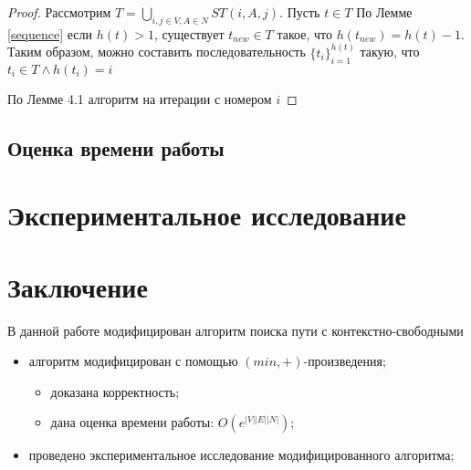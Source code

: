 \documentclass[14pt]{matmex-diploma}
\theoremstyle{definition}
\begin{document}
        \begin{proof}
            Рассмотрим  $T = \bigcup_{i,j \in V, A \in N}ST(i,A,j)$. Пусть $t \in T$
            По Лемме \ref{sequence} если $h(t) > 1$, существует $t_{new} \in T$ такое, что $h(t_{new}) = h(t)-1$. Таким образом, можно составить последовательность $\{t_i\}^{h(t)}_{i=1}$ такую, что $t_i \in T \land h(t_i) = i$
            
           По Лемме 4.1\cite{DBLP:journals/corr/AzimovG17} алгоритм на итерации с номером $i$ 
        \end{proof}
    \subsection{Оценка времени работы}
\section{Экспериментальное исследование}
    
\section*{Заключение}
    В данной работе модифицирован алгоритм поиска пути с контекстно-свободными %
    \begin{itemize}
        \item алгоритм модифицирован с помощью $(min, +)$-произведения;
        \begin{itemize}
            \item доказана корректность;
            \item дана оценка времени работы: $O(e^{|V||E||N|})$;
        \end{itemize}
        \item проведено экспериментальное исследование модифицированного алгоритма;
    \end{itemize}
    
\setmonofont[Mapping=tex-text]{CMU Typewriter Text}


\end{document}
